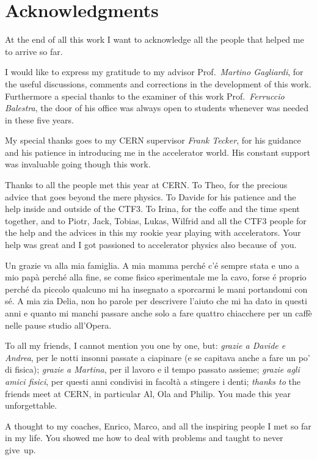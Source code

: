 \chapter*{Acknowledgments}

At the end of all this work I want to acknowledge all the people that helped me to arrive so far.

I would like to express my gratitude to my advisor Prof.~\textit{Martino Gagliardi}, for the useful discussions, comments and corrections in the development of this work. Furthermore a special thanks to the examiner of this work Prof.~\textit{Ferruccio Balestra}, the door of his office was always open to students whenever was needed in these five years. 

My special thanks goes to my CERN supervisor \textit{Frank Tecker}, for his guidance and his patience in introducing me in the accelerator world. His constant support was invaluable going though this work.

Thanks to all the people met this year at CERN. To Theo, for the precious advice that goes beyond the mere physics. To Davide for his patience and the help inside and outside of the CTF3. To Irina, for the coffe and the time spent together,  and to Piotr, Jack, Tobias, Lukas, Wilfrid and all the CTF3 people for the help and the advices in this my rookie year playing with accelerators. Your help was great and I got passioned to accelerator physics also because of~you.

Un grazie va alla mia famiglia.  A mia mamma perché c'é sempre stata e uno a mio pap\`a perché alla fine, se come fisico sperimentale me la cavo, forse é proprio perché da piccolo qualcuno mi ha insegnato a sporcarmi le mani portandomi con sé. A mia zia Delia, non ho parole per descrivere l'aiuto che mi ha dato in questi anni e quanto mi manchi passare anche solo a fare quattro chiacchere per un caff\`e nelle pause studio all'Opera.

To all my friends, I cannot mention you one by one, but: \textit{grazie a Davide e Andrea}, per le notti insonni passate a ciapinare (e se capitava anche a fare un po' di fisica); \textit{grazie a Martina}, per il lavoro e il tempo passato assieme; \textit{grazie agli amici fisici}, per questi anni condivisi in facolt\`a a stingere i denti; \textit{thanks to} the friends meet at CERN, in particular Al, Ola and Philip. You made this year unforgettable.

A thought to my coaches, Enrico, Marco, and all the inspiring people I met so far in my life. You showed me how to deal with problems and taught to never give~up.

